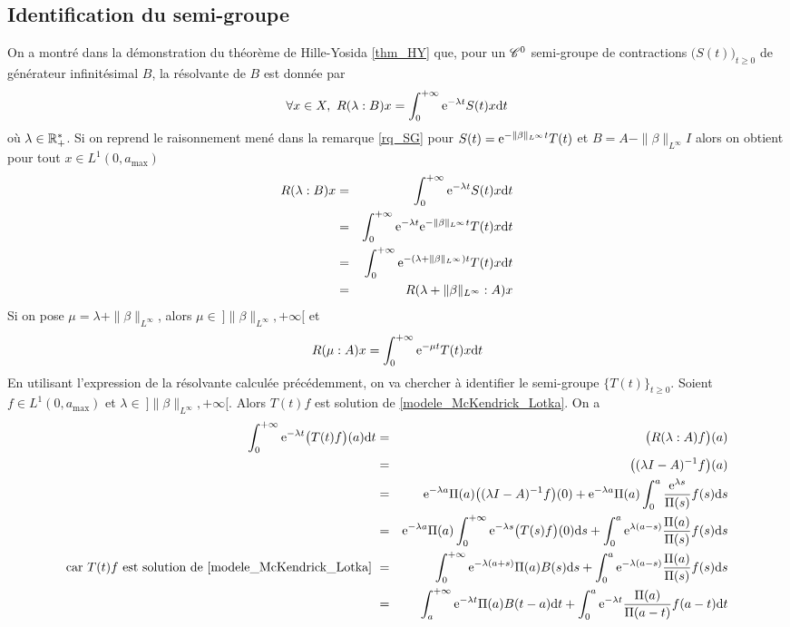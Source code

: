 \subsection{Identification du semi-groupe}
On a montré dans la démonstration du théorème de Hille-Yosida \ref{thm_HY} que, pour un $\mathscr{C}^0$ semi-groupe de contractions $\big(S(t)\big)_{t \geq 0}$ de générateur infinitésimal $B$, la résolvante de $B$ est donnée par 
\begin{equation*}
    \forall x \in X, \ R(\lambda : B)x = \int_0^{+\infty}\mathrm{e}^{-\lambda t}S(t)x\mathrm{d} t
\end{equation*}
où $\lambda \in \mathbb{R}_+^*$. Si on reprend le raisonnement mené dans la remarque \ref{rq_SG} pour $S(t)=\mathrm{e}^{-\|\beta\|_{L^\infty}t}T(t)$ et $B=A-\|\beta\|_{L^\infty}I$ alors on obtient pour tout $x \in L^1(0,a_{\max})$
\begin{eqnarray*}
    R(\lambda : B)x &=& \int_0^{+\infty}\mathrm{e}^{-\lambda t}S(t)x\mathrm{d} t \\
    &=& \int_0^{+\infty}\mathrm{e}^{-\lambda t} \mathrm{e}^{-\|\beta\|_{L^\infty} t}T(t)x\mathrm{d} t \\
    &=& \int_0^{+\infty}\mathrm{e}^{-(\lambda+\|\beta\|_{L^\infty})t}T(t)x\mathrm{d} t \\
    &=& R(\lambda + \|\beta\|_{L^\infty} : A)x
\end{eqnarray*}
Si on pose $\mu = \lambda + \|\beta\|_{L^\infty}$, alors $\mu \in \ ]\|\beta\|_{L^\infty}, +\infty[$ et 
\begin{equation*}
    R(\mu : A)x = \int_0^{+\infty}\mathrm{e}^{-\mu t}T(t)x\mathrm{d} t
\end{equation*}
En utilisant l'expression de la résolvante calculée précédemment, on va chercher à identifier le semi-groupe $\big\{T(t)\big\}_{t \geq 0}$. Soient $f \in L^1(0,a_{\max})$ et $\lambda \in \ ]\|\beta\|_{L^\infty},+\infty[$. Alors $T(t)f$ est solution de 
\eqref{modele_McKendrick_Lotka}. On a 
\begin{eqnarray*}
    \int_0^{+\infty}\mathrm{e}^{-\lambda t}\big(T(t)f\big)(a)\mathrm{d} t &=& \big(R(\lambda : A)f\big)(a) \\
    &=& \big((\lambda I - A)^{-1}f\big)(a) \\
    &=& \mathrm{e}^{-\lambda a}\Pi(a)\big((\lambda I - A)^{-1}f\big)(0)+\mathrm{e}^{-\lambda a}\Pi(a)\int_0^a\frac{\mathrm{e}^{\lambda s}}{\Pi(s)}f(s)\mathrm{d} s \\
    &=& \mathrm{e}^{-\lambda a}\Pi(a)\int_0^{+\infty}\mathrm{e}^{-\lambda s}\big(T(s)f\big)(0)\mathrm{d} s + \int_0^a\mathrm{e}^{\lambda (a-s)}\frac{\Pi(a)}{\Pi(s)}f(s)\mathrm{d} s \\
    \text{car $T(t)f$ est solution de \eqref{modele_McKendrick_Lotka} } &=& \int_0^{+\infty}\mathrm{e}^{-\lambda (a+s)}\Pi(a)B(s)\mathrm{d} s + \int_0^a\mathrm{e}^{-\lambda (a-s)}\frac{\Pi(a)}{\Pi(s)}f(s)\mathrm{d} s \\
    &=& \int_a^{+\infty}\mathrm{e}^{-\lambda t}\Pi(a) B(t-a)\mathrm{d} t + \int_0^a \mathrm{e}^{-\lambda t}\frac{\Pi(a)}{\Pi(a-t)}f(a-t)\mathrm{d} t
\end{eqnarray*}
